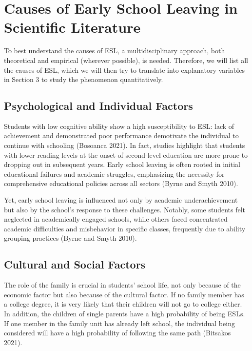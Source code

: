 \documentclass[
  letterpaper,
  DIV=11,
  numbers=noendperiod,
  abstract]{scrartcl}
\begin{document}
\section{Causes of Early School Leaving in Scientific
Literature}\label{causes-of-early-school-leaving-in-scientific-literature}

To best understand the causes of ESL, a multidisciplinary approach, both
theoretical and empirical (wherever possible), is needed. Therefore, we
will list all the causes of ESL, which we will then try to translate
into explanatory variables in Section 3 to study the phenomenon
quantitatively.

\subsection{Psychological and Individual
Factors}\label{psychological-and-individual-factors}

Students with low cognitive ability show a high susceptibility to ESL:
lack of achievement and demonstrated poor performance demotivate the
individual to continue with schooling (Bosoanca 2021). In fact, studies
highlight that students with lower reading levels at the onset of
second-level education are more prone to dropping out in subsequent
years. Early school leaving is often rooted in initial educational
failures and academic struggles, emphasizing the necessity for
comprehensive educational policies across all sectors (Byrne and Smyth
2010).

Yet, early school leaving is influenced not only by academic
underachievement but also by the school's response to these challenges.
Notably, some students felt neglected in academically engaged schools,
while others faced concentrated academic difficulties and misbehavior in
specific classes, frequently due to ability grouping practices (Byrne
and Smyth 2010).

\subsection{Cultural and Social
Factors}\label{cultural-and-social-factors}

The role of the family is crucial in students' school life, not only
because of the economic factor but also because of the cultural factor.
If no family member has a college degree, it is very likely that their
children will not go to college either. In addition, the children of
single parents have a high probability of being ESLs. If one member in
the family unit has already left school, the individual being considered
will have a high probability of following the same path (Bitsakos 2021).
\end{document}
